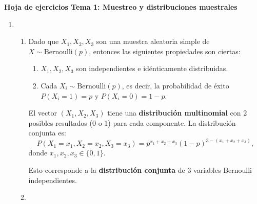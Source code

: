 \begin{center}
\textbf{\large Hoja de ejercicios Tema 1: Muestreo y distribuciones muestrales}
\end{center}
\begin{enumerate}[label=\color{red}\textbf{\arabic*)}]
    \item {}
        \begin{enumerate}[label=\color{red}\textbf{\alph*)}]
            \item {}

                Dado que $X_1,X_2,X_3$ son una muestra aleatoria simple de $X\sim \mathrm{Bernoulli}(p)$, entonces las siguientes propiedades son ciertas:
                \begin{enumerate}[label=\arabic*)]
                    \item $X_1,X_2,X_3$ son independientes e idénticamente distribuidas.
                    \item Cada $X_i\sim \mathrm{Bernoulli}(p)$, es decir, la probabilidad de éxito $P(X_i=1)=p$ y  $P(X_i=0)=1-p$.
                \end{enumerate}
                El vector $(X_1,X_2,X_3)$ tiene una \textbf{distribución multinomial} con 2 posibles resultados (0 o 1) para cada componente. La distribución conjunta es: \[
                P(X_1=x_1,X_2=x_2,X_3=x_3)=p^{x_1+x_2+x_3}(1-p)^{3-(x_1+x_2+x_3)},
                \]donde $x_1,x_2,x_3\in \{0,1\} $.

                Esto corresponde a la \textbf{distribución conjunta} de 3 variables Bernoulli independientes. 
            \item {} 


\end{enumerate}
\end{enumerate}
